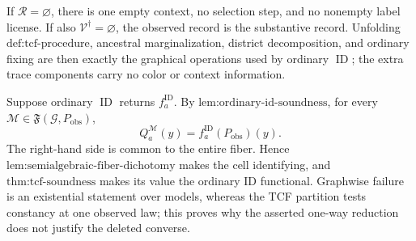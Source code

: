 If \(\mathcal R=\varnothing\), there is one empty context, no selection step, and no nonempty label license. If also \(\mathcal V^{\dagger}=\varnothing\), the observed record is the substantive record. Unfolding \(\text{def:tcf-procedure}\), ancestral marginalization, district decomposition, and ordinary fixing are then exactly the graphical operations used by ordinary \(\operatorname{ID}\); the extra trace components carry no color or context information.

Suppose ordinary \(\operatorname{ID}\) returns \(f_a^{\mathrm{ID}}\). By \(\text{lem:ordinary-id-soundness}\), for every \(\mathcal M\in\mathfrak F(\mathcal G,P_{\mathrm{obs}})\),
\[
Q_a^{\mathcal M}(y)=f_a^{\mathrm{ID}}(P_{\mathrm{obs}})(y).
\]
The right-hand side is common to the entire fiber. Hence \(\text{lem:semialgebraic-fiber-dichotomy}\) makes the cell identifying, and \(\text{thm:tcf-soundness}\) makes its value the ordinary ID functional. Graphwise failure is an existential statement over models, whereas the TCF partition tests constancy at one observed law; this proves why the asserted one-way reduction does not justify the deleted converse.